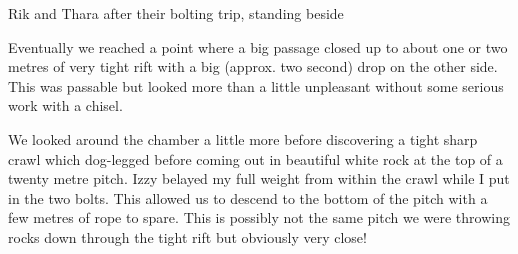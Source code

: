 \begin{marginfigure}
\caption{Rik and Thara after their bolting trip, standing beside  }
\end{marginfigure}

Eventually we reached a point where a big passage closed up to about one
or two metres of very tight rift with a big (approx. two second) drop on
the other side. This was passable but looked more than a little
unpleasant without some serious work with a chisel.

We looked around the chamber a little more before discovering a tight
sharp crawl which dog-legged before coming out in beautiful white rock
at the top of a twenty metre pitch. Izzy belayed my full weight from
within the crawl while I put in the two bolts. This allowed us to
descend to the bottom of the pitch with a few metres of rope to spare.
This is possibly not the same pitch we were throwing rocks down through
the tight rift but obviously very close!


